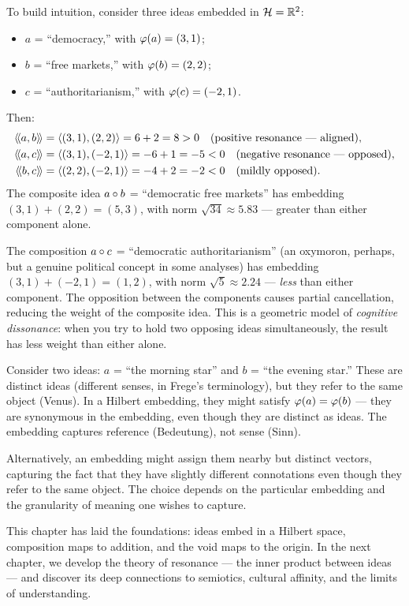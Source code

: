 \begin{example}
\label{ex:three-ideas}
To build intuition, consider three ideas embedded in $\mathcal{H} = \mathbb{R}^2$:
\begin{itemize}
\item $a$ = ``democracy,'' with $\varphi(a) = (3, 1)$;
\item $b$ = ``free markets,'' with $\varphi(b) = (2, 2)$;
\item $c$ = ``authoritarianism,'' with $\varphi(c) = (-2, 1)$.
\end{itemize}
Then:
\begin{align*}
  \langle\!\langle a, b \rangle\!\rangle &= \langle (3,1), (2,2) \rangle = 6 + 2 = 8 > 0 \quad \text{(positive
  resonance --- aligned)}, \\
  \langle\!\langle a, c \rangle\!\rangle &= \langle (3,1), (-2,1) \rangle = -6 + 1 = -5 < 0 \quad \text{(negative
  resonance --- opposed)}, \\
  \langle\!\langle b, c \rangle\!\rangle &= \langle (2,2), (-2,1) \rangle = -4 + 2 = -2 < 0 \quad \text{(mildly
  opposed)}.
\end{align*}
The composite idea $a \circ b$ = ``democratic free markets'' has embedding
$(3,1) + (2,2) = (5,3)$, with norm $\sqrt{34} \approx 5.83$ --- greater than
either component alone.

The composition $a \circ c$ = ``democratic authoritarianism'' (an oxymoron,
perhaps, but a genuine political concept in some analyses) has embedding
$(3,1) + (-2,1) = (1,2)$, with norm $\sqrt{5} \approx 2.24$ --- \emph{less}
than either component. The opposition between the components causes partial
cancellation, reducing the weight of the composite idea. This is a geometric
model of \emph{cognitive dissonance}: when you try to hold two opposing ideas
simultaneously, the result has less weight than either alone.
\end{example}

\begin{example}
\label{ex:non-injective}
Consider two ideas: $a$ = ``the morning star'' and $b$ = ``the evening star.''
These are distinct ideas (different senses, in Frege's terminology), but they
refer to the same object (Venus). In a Hilbert embedding, they might satisfy
$\varphi(a) = \varphi(b)$ --- they are synonymous in the embedding, even though
they are distinct as ideas. The embedding captures reference (Bedeutung), not
sense (Sinn).

Alternatively, an embedding might assign them nearby but distinct vectors,
capturing the fact that they have slightly different connotations even though
they refer to the same object. The choice depends on the particular embedding
and the granularity of meaning one wishes to capture.
\end{example}

\bigskip

This chapter has laid the foundations: ideas embed in a Hilbert space, composition
maps to addition, and the void maps to the origin. In the next chapter, we
develop the theory of resonance --- the inner product between ideas --- and
discover its deep connections to semiotics, cultural affinity, and the limits of
understanding.
